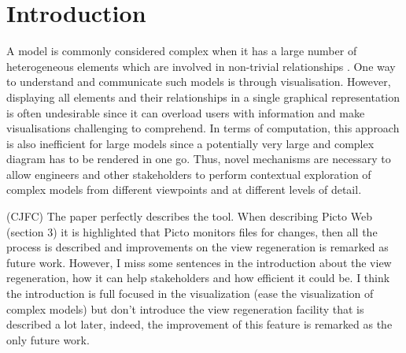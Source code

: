 \documentclass[sigconf,review]{acmart}
\begin{document}

\newcommand{\carlos}[1]{{\color{blue} (CJFC) #1}}
\newcommand{\agd}[1]{{\color{DarkGreen} (AGD) #1}}



\maketitle

\section{Introduction}
\label{sec:introduction}
A model is commonly considered complex when it has a large number of heterogeneous elements which are involved in non-trivial relationships \cite{boccara2010complex,klosterman2012complex}. One way to understand and communicate such models is through visualisation. However, displaying all elements and their relationships in a single graphical representation is often undesirable since it can overload users with information and make visualisations challenging to comprehend. In terms of computation, this approach is also inefficient for large models since a potentially very large and complex diagram has to be rendered in one go. Thus, novel mechanisms are necessary to allow engineers and other stakeholders to perform contextual exploration of complex models from different viewpoints and at different levels of detail. 

\carlos{
The paper perfectly describes the tool.  When describing Picto Web (section 3) it is highlighted that Picto monitors files for changes,  then all the process is described and improvements on the view regeneration is remarked as future work. 
However,  I miss some sentences in the introduction about the view regeneration,  how it can help stakeholders and how efficient it could be. 
I think the introduction is full focused in the visualization (ease the visualization of complex models) but don't introduce the view regeneration facility that is described a lot later,  indeed,  the improvement of this feature is remarked as the only future work.
}
\end{document}
